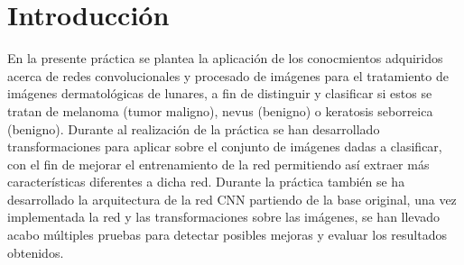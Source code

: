 \section{Introducción}

En la presente práctica se plantea la aplicación de los conocmientos adquiridos acerca de redes convolucionales y procesado de imágenes para el tratamiento de imágenes dermatológicas de lunares, a fin de distinguir y clasificar si estos se tratan de melanoma (tumor maligno), nevus (benigno) o keratosis seborreica (benigno).
Durante al realización de la práctica se han desarrollado transformaciones para aplicar sobre el conjunto de imágenes dadas a clasificar, con el fin de mejorar el entrenamiento de la red 
permitiendo así extraer más características diferentes a dicha red. Durante la práctica también se ha desarrollado la arquitectura de la red CNN partiendo de la base original, una vez 
implementada la red y las transformaciones sobre las imágenes, se han llevado acabo múltiples pruebas para detectar posibles mejoras y evaluar los resultados obtenidos.










